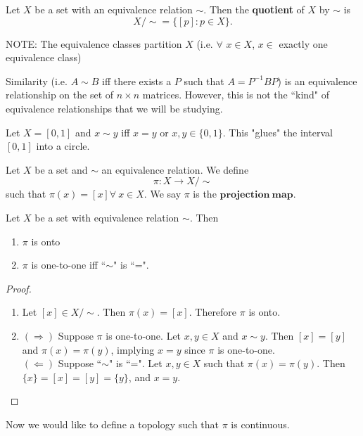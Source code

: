 \begin{definition}
Let $X$ be a set with an equivalence relation $\sim$. Then the {\bf quotient} of $X$ by $\sim$ is 
\[X / \sim = \{ [p] : p \in X\}.\]
\end{definition}
NOTE: The equivalence classes partition $X$ (i.e. $\forall$ $x \in X$, $x \in$ exactly one equivalence class)

\begin{example}
Similarity (i.e. $A \sim B$ iff there exists a $P$ such that $A = P^{-1}BP$) is an equivalence relationship on the set of $n \times n$ matrices. However, this is not the ``kind" of equivalence relationships that we will be studying.
\end{example}

\begin{example}
Let $X = [0,1]$ and $x\sim y$ iff $x = y$ or $x,y \in \{0,1\}$. This "glues" the interval $[0,1]$ into a circle. 
\end{example}

\begin{definition}
Let $X$ be a set and $\sim$ an equivalence relation. We define $$\pi: X \rightarrow X / \sim$$ such that $\pi(x) = [x] \forall \ x \in X$. We say $\pi$ is the $\mathbf{projection \ map}$. 
\end{definition}

\begin{tinyfact}
Let $X$ be a set with equivalence relation $\sim$. Then
\begin{enumerate}
	\item $\pi$ is onto
	\item $\pi$ is one-to-one iff ``$\sim$" is ``=". 
\end{enumerate}
\end{tinyfact}
\begin{proof}
\begin{enumerate}
	\item Let $[x] \in X / \sim$. Then $\pi(x) = [x]$. Therefore $\pi$ is onto.
	\item $(\Rightarrow)$ Suppose $\pi$ is one-to-one. Let $x,y \in X$ and $x \sim y$. Then $[x] = [y]$ and $\pi(x) = \pi(y)$, implying $x = y$ since $\pi$ is one-to-one.\\
	$(\Leftarrow)$ Suppose ``$\sim$" is ``=". Let $x,y \in X$ such that $\pi(x) = \pi(y)$. Then $\{x\} = [x] = [y] = \{y\}$, and $x = y$. 
\end{enumerate}
\end{proof}

Now we would like to define a topology such that $\pi$ is continuous. 

